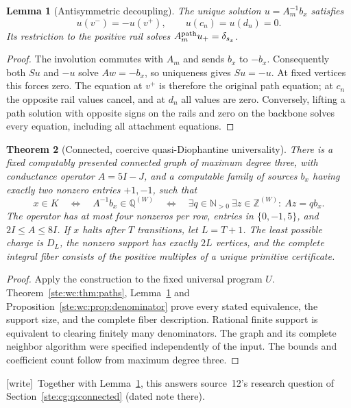 \documentclass[11pt,letterpaper]{article}
\newtheorem{theorem}{Theorem}[section]
\newtheorem{lemma}[theorem]{Lemma}
\theoremstyle{definition}
\theoremstyle{remark}
\newcommand{\N}{\mathbb N}
\newcommand{\Z}{\mathbb Z}
\newcommand{\Q}{\mathbb Q}
\newcommand{\wtag}{\textup{[write]}}
\begin{document}
\begin{lemma}[Antisymmetric decoupling]\label{ste:wc:lem:antisym}
The unique solution $u=A_m^{-1}b_x$ satisfies
\[
 u(v^-)=-u(v^+),\qquad u(c_n)=u(d_n)=0.
\]
Its restriction to the positive rail solves
$A^{\rm path}_m u_+=\delta_{s_x}$.
\end{lemma}
\begin{proof}
The involution commutes with $A_m$ and sends $b_x$ to $-b_x$.
Consequently both $Su$ and $-u$ solve $Aw=-b_x$, so uniqueness gives
$Su=-u$. At fixed vertices this forces zero. The equation at $v^+$ is
therefore the original path equation; at $c_n$ the opposite rail values
cancel, and at $d_n$ all values are zero. Conversely, lifting a path
solution with opposite signs on the rails and zero on the backbone solves
every equation, including all attachment equations.
\end{proof}

\begin{theorem}[Connected, coercive quasi-Diophantine universality]
\label{ste:wc:thm:main}
There is a fixed computably presented connected graph of maximum degree
three, with conductance operator $A=5I-J$, and a computable family of
sources $b_x$ having exactly two nonzero entries $+1,-1$, such that
\begin{equation}\label{ste:wc:eq:mainiff}
 x\in K\quad\Longleftrightarrow\quad
 A^{-1}b_x\in\Q^{(W)}\quad\Longleftrightarrow\quad
 \exists q\in\N_{>0}\ \exists z\in\Z^{(W)}:\ Az=qb_x.
\end{equation}
The operator has at most four nonzeros per row, entries in $\{0,-1,5\}$,
and $2I\leq A\leq8I$. If $x$ halts after $T$ transitions, let $L=T+1$.
The least possible charge is $D_L$, the nonzero support has exactly $2L$
vertices, and the complete integral fiber consists of the positive
multiples of a unique primitive certificate.
\end{theorem}
\begin{proof}
Apply the construction to the fixed universal program $U$.
Theorem~\ref{ste:wc:thm:paths}, Lemma~\ref{ste:wc:lem:antisym} and Proposition~\ref{ste:wc:prop:denominator} prove every stated equivalence,
the support size, and the complete fiber description. Rational finite
support is equivalent to clearing finitely many denominators. The graph
and its complete neighbor algorithm were specified independently of the
input. The bounds and coefficient count follow from maximum degree three.
\end{proof}

\wtag\ Together with Lemma~\ref{ste:wc:lem:antisym}, this answers source~12's research question of Section~\ref{ste:cg:q:connected} (dated note there).
\end{document}
